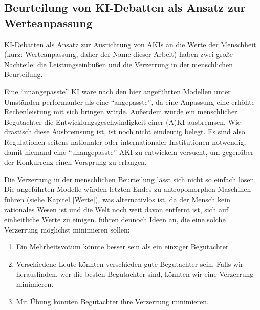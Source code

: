 \subsection{Beurteilung von KI-Debatten als Ansatz zur Werteanpassung}

KI-Debatten als Ansatz zur Ausrichtung von AKIs an die Werte der Menschheit (kurz: Werteanpassung, daher der Name dieser Arbeit) haben zwei große Nachteile: die Leistungseinbußen und die Verzerrung in der menschlichen Beurteilung.

Eine \enquote{unangepasste} KI wäre nach den hier angeführten Modellen unter Umständen performanter als eine \enquote{angepasste}, da eine Anpassung eine erhöhte Rechenleistung mit sich bringen würde.  Außerdem würde ein menschlicher Begutachter die Entwicklungsgeschwindigkeit einer (A)KI ausbremsen. Wie drastisch diese Ausbremsung ist, ist noch nicht eindeutig belegt. Es sind also Regulationen seitens nationaler oder internationaler Institutionen notwendig, damit niemand eine \enquote{unangepasste} AKI zu entwickeln versucht, um gegenüber der Konkurrenz einen Vorsprung zu erlangen.

Die Verzerrung in der menschlichen Beurteilung lässt sich nicht so einfach lösen. Die angeführten Modelle würden letzten Endes zu antropomorphen Maschinen führen (siehe Kapitel \ref{Werte}), was alternativlos ist, da der Mensch kein rationales Wesen ist und die Welt noch weit davon entfernt ist, sich auf einheitliche Werte zu einigen. \citeauthor{irving_ai_2018} führen dennoch Ideen an, die eine solche Verzerrung möglichst minimieren sollen:

\begin{enumerate}
\item Ein Mehrheitsvotum könnte besser sein als ein einziger Begutachter
\item Verschiedene Leute könnten verschieden gute Begutachter sein. Falls wir herausfinden, wer die besten Begutachter sind, könnten wir eine Verzerrung minimieren.
\item Mit Übung könnten Begutachter ihre Verzerrung minimieren. 
\end{enumerate}





